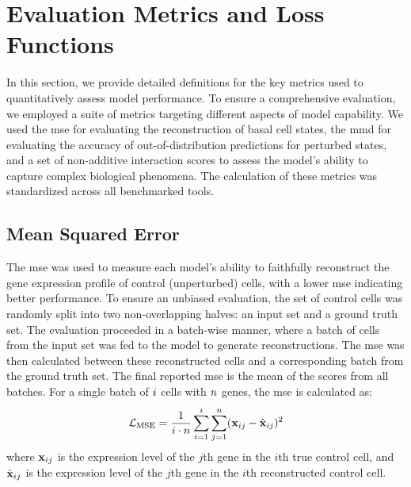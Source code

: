 \section{Evaluation Metrics and Loss Functions}
\label{app:metrics}

In this section, we provide detailed definitions for the key metrics used to quantitatively assess model performance.
To ensure a comprehensive evaluation, we employed a suite of metrics targeting different aspects of model capability.
We used the \gls{mse} for evaluating the reconstruction of basal cell states, the \gls{mmd} for evaluating the accuracy of out-of-distribution predictions for perturbed states, and a set of non-additive interaction scores to assess the model's ability to capture complex biological phenomena.
The calculation of these metrics was standardized across all benchmarked tools.

\subsection{Mean Squared Error}
\label{app:metrics:mse}

The \gls{mse} was used to measure each model's ability to faithfully reconstruct the gene expression profile of control (unperturbed) cells, with a lower \gls{mse} indicating better performance.
To ensure an unbiased evaluation, the set of control cells was randomly split into two non-overlapping halves: an input set and a ground truth set.
The evaluation proceeded in a batch-wise manner, where a batch of cells from the input set was fed to the model to generate reconstructions.
The \gls{mse} was then calculated between these reconstructed cells and a corresponding batch from the ground truth set.
The final reported \gls{mse} is the mean of the scores from all batches.
For a single batch of $i$ cells with $n$ genes, the \gls{mse} is calculated as:
\begin{equation}
    \mathcal{L}_{\text{MSE}} = \frac{1}{i \cdot n} \sum_{i=1}^{i} \sum_{j=1}^{n} ({\mathbf{x}}_{ij} - \hat{{\mathbf{x}}}_{ij})^2
    \label{eq:app:mse}
\end{equation}
where ${\mathbf{x}}_{ij}$ is the expression level of the $j$\-th gene in the $i$\-th true control cell, and $\hat{{\mathbf{x}}}_{ij}$ is the expression level of the $j$\-th gene in the $i$\-th reconstructed control cell.

